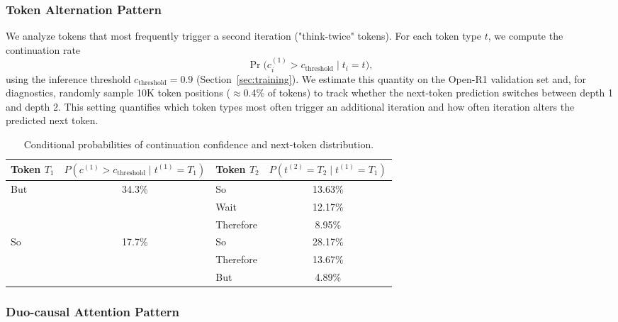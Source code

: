 \subsubsection{Token Alternation Pattern}
\label{sec:appendix/exp/flow}

We analyze tokens that most frequently trigger a second iteration ("think-twice" tokens). For each token type $t$, we compute the continuation rate
\[
\Pr\big(c_i^{(1)} > c_{\text{threshold}} \mid t_i = t\big),
\]
using the inference threshold $c_{\text{threshold}}=0.9$ (Section~\ref{sec:training}). We estimate this quantity on the Open-R1 validation set and, for diagnostics, randomly sample 10K token positions (\(\approx\)0.4\% of tokens) to track whether the next-token prediction switches between depth 1 and depth 2. This setting quantifies which token types most often trigger an additional iteration and how often iteration alters the predicted next token.


\begin{table}[tb]
    \centering
    \caption{Conditional probabilities of continuation confidence and next-token distribution.}
    \begin{tabular}{lclc}
    \toprule
    \textbf{Token $T_1$} & $P(c^{(1)} > c_{\text{threshold}} \mid t^{(1)}=T_1)$ & \textbf{Token $T_2$} & $P(t^{(2)}=T_2 \mid t^{(1)}=T_1)$ \\
    \midrule
    \multirow{3}{*}{But} & \multirow{3}{*}{34.3\%} & So        & 13.63\% \\
                         &                          & Wait      & 12.17\% \\
                         &                          & Therefore & 8.95\%  \\
    \midrule
    \multirow{3}{*}{So}  & \multirow{3}{*}{17.7\%} & So        & 28.17\% \\
                         &                          & Therefore & 13.67\% \\
                         &                          & But       & 4.89\%  \\
    \bottomrule
    \end{tabular}
    \label{tab:token_probs}
\end{table}



\subsubsection{Duo-causal Attention Pattern}
\label{sec:appendix/exp/attention}

